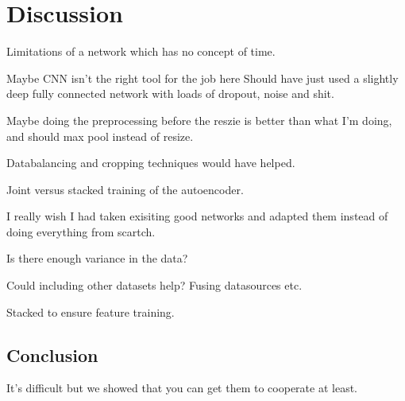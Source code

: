 \chapter{Discussion}
  Limitations of a network which has no concept of time.

  Maybe CNN isn't the right tool for the job here
  Should have just used a slightly deep fully connected network
  with loads of dropout, noise and shit.

  Maybe doing the preprocessing before the reszie is better than what I'm doing,
  and should max pool instead of resize.

  Databalancing and cropping techniques would have helped.

  Joint versus stacked training of the autoencoder.

  I really wish I had taken exisiting good networks and adapted them instead of doing
  everything from scartch.

  Is there enough variance in the data?

  Could including other datasets help? Fusing datasources etc.

  Stacked to ensure feature training.

  \section{Conclusion}
  It's difficult but we showed that you can get them to cooperate at least.
